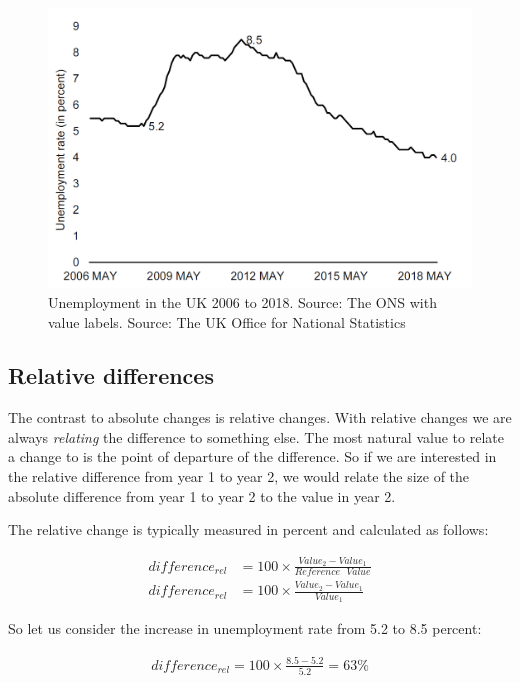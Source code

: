 \documentclass[]{book}
\begin{document}
\begin{figure}

{\centering \includegraphics[width=0.8\linewidth]{_resources/chapter_describe/ex4} 

}

\caption{Unemployment in the UK 2006 to 2018. Source: The ONS with value labels. Source: The UK Office for National Statistics}\label{fig:desc2}
\end{figure}

\hypertarget{relative-differences}{%
\subsection{Relative differences}\label{relative-differences}}

The contrast to absolute changes is relative changes. With relative changes we are always \emph{relating} the difference to something else. The most natural value to relate a change to is the point of departure of the difference. So if we are interested in the relative difference from year 1 to year 2, we would relate the size of the absolute difference from year 1 to year 2 to the value in year 2.

The relative change is typically measured in percent and calculated as follows:

\begin{align}
  difference_{rel}&=100\times \frac{Value_2-Value_1}{Reference \text{ } Value}\nonumber\\
  difference_{rel}&=100\times \frac{Value_2-Value_1}{Value_1}\nonumber
\end{align}

So let us consider the increase in unemployment rate from 5.2 to 8.5 percent:

\begin{align}
    difference_{rel}=100\times \frac{8.5-5.2}{5.2}=63\%\nonumber
\end{align}
\end{document}
